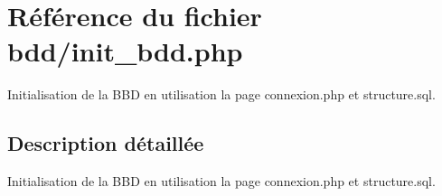 \hypertarget{init__bdd_8php}{}\section{Référence du fichier bdd/init\+\_\+bdd.php}
\label{init__bdd_8php}


Initialisation de la B\+BD en utilisation la page connexion.\+php et structure.\+sql.  




\subsection{Description détaillée}
Initialisation de la B\+BD en utilisation la page connexion.\+php et structure.\+sql. 

